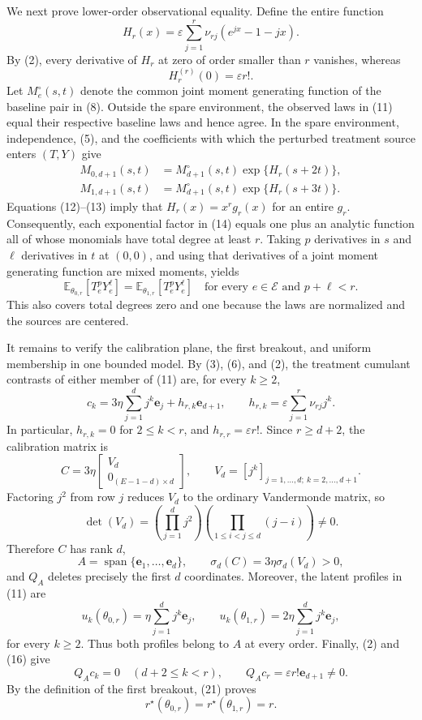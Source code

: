 We next prove lower-order observational equality.  Define the entire function
\[
 H_r(x)=\varepsilon\sum_{j=1}^{r}\nu_{rj}(e^{jx}-1-jx).
 \tag{12}
\]
By (2), every derivative of \(H_r\) at zero of order smaller than \(r\) vanishes, whereas
\[
 H_r^{(r)}(0)=\varepsilon r!.
 \tag{13}
\]
Let \(M_e^\circ(s,t)\) denote the common joint moment generating function of the baseline pair in (8).  Outside the spare environment, the observed laws in (11) equal their respective baseline laws and hence agree.  In the spare environment, independence, (5), and the coefficients with which the perturbed treatment source enters \((T,Y)\) give
\[
 \begin{aligned}
 M_{0,d+1}(s,t)&=M_{d+1}^\circ(s,t)\exp\{H_r(s+2t)\},\\
 M_{1,d+1}(s,t)&=M_{d+1}^\circ(s,t)\exp\{H_r(s+3t)\}.
 \end{aligned}
 \tag{14}
\]
Equations (12)--(13) imply that \(H_r(x)=x^rg_r(x)\) for an entire \(g_r\).  Consequently, each exponential factor in (14) equals one plus an analytic function all of whose monomials have total degree at least \(r\).  Taking \(p\) derivatives in \(s\) and \(\ell\) derivatives in \(t\) at \((0,0)\), and using that derivatives of a joint moment generating function are mixed moments, yields
\[
 \mathbb E_{\theta_{0,r}}[T_e^pY_e^\ell]
 =\mathbb E_{\theta_{1,r}}[T_e^pY_e^\ell]
 \quad
 \text{for every }e\in\mathcal E\text{ and }p+\ell<r.
 \tag{15}
\]
This also covers total degrees zero and one because the laws are normalized and the sources are centered.

It remains to verify the calibration plane, the first breakout, and uniform membership in one bounded model.  By (3), (6), and (2), the treatment cumulant contrasts of either member of (11) are, for every \(k\geq2\),
\[
 c_k
 =3\eta\sum_{j=1}^{d}j^k\mathbf e_j
  +h_{r,k}\mathbf e_{d+1},
 \qquad
 h_{r,k}=\varepsilon\sum_{j=1}^{r}\nu_{rj}j^k.
 \tag{16}
\]
In particular, \(h_{r,k}=0\) for \(2\leq k<r\), and \(h_{r,r}=\varepsilon r!\).  Since \(r\geq d+2\), the calibration matrix is
\[
 C=3\eta
 \begin{bmatrix}
 V_d\\
 0_{(E-1-d)\times d}
 \end{bmatrix},
 \qquad
 V_d=[j^k]_{j=1,\ldots,d;\ k=2,\ldots,d+1}.
 \tag{17}
\]
Factoring \(j^2\) from row \(j\) reduces \(V_d\) to the ordinary Vandermonde matrix, so
\[
 \det(V_d)=
 \left(\prod_{j=1}^{d}j^2\right)
 \left(\prod_{1\leq i<j\leq d}(j-i)\right)\neq0.
 \tag{18}
\]
Therefore \(C\) has rank \(d\),
\[
 A=\operatorname{span}\{\mathbf e_1,\ldots,\mathbf e_d\},
 \qquad
 \sigma_d(C)=3\eta\sigma_d(V_d)>0,
 \tag{19}
\]
and \(Q_A\) deletes precisely the first \(d\) coordinates.  Moreover, the latent profiles in (11) are
\[
 u_k(\theta_{0,r})=\eta\sum_{j=1}^{d}j^k\mathbf e_j,
 \qquad
 u_k(\theta_{1,r})=2\eta\sum_{j=1}^{d}j^k\mathbf e_j,
 \tag{20}
\]
for every \(k\geq2\).  Thus both profiles belong to \(A\) at every order.  Finally, (2) and (16) give
\[
 Q_Ac_k=0\quad(d+2\leq k<r),
 \qquad
 Q_Ac_r=\varepsilon r!\mathbf e_{d+1}\neq0.
 \tag{21}
\]
By the definition of the first breakout, (21) proves
\[
 r^\star(\theta_{0,r})=r^\star(\theta_{1,r})=r.
 \tag{22}
\]


